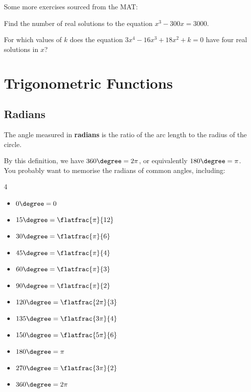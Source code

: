 \documentclass{article}
\begin{document}
Some more exercises sourced from the MAT:
\begin{example}
    Find the number of real solutions to the equation \(x^3 - 300 x = 3000\).
\end{example}

\begin{example}
    For which values of \(k\) does the equation \(3 x^4 - 16 x^3 + 18 x^2 + k = 0\) have four real solutions in \(x\)?
\end{example}

\section{Trigonometric Functions}
\subsection{Radians}

The angle measured in \textbf{radians} is the ratio of the arc length to the radius of the circle.

By this definition, we have \(360 \degree = 2 \pi\), or equivalently \(180 \degree = \pi\). You probably want to memorise the radians of common angles, including:
\begin{multicols}{4}
    \begin{itemize}
        \item \(0 \degree = 0\)
        \item \(15 \degree = \flatfrac{\pi}{12}\)
        \item \(30 \degree = \flatfrac{\pi}{6}\)
        \item \(45 \degree = \flatfrac{\pi}{4}\)
        \item \(60 \degree = \flatfrac{\pi}{3}\)
        \item \(90 \degree = \flatfrac{\pi}{2}\)
        \item \(120 \degree = \flatfrac{2\pi}{3}\)
        \item \(135 \degree = \flatfrac{3\pi}{4}\)
        \item \(150 \degree = \flatfrac{5\pi}{6}\)
        \item \(180 \degree = \pi\)
        \item \(270 \degree = \flatfrac{3\pi}{2}\)
        \item \(360 \degree = 2 \pi\)
    \end{itemize}
\end{multicols}
\end{document}
